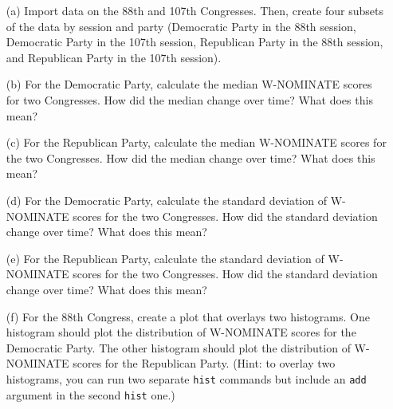\documentclass[12pt,letterpaper]{article}
\begin{document}
\begin{itemize}

\item[(a)] Import data on the 88th and 107th Congresses. Then, create four subsets of the data by session and party (Democratic Party in the 88th session, Democratic Party in the 107th session, Republican Party in the 88th session, and Republican Party in the 107th session). \\

\item[(b)] For the Democratic Party, calculate the median W-NOMINATE scores for two Congresses. How did the median change over time? What does this mean? \\

\item[(c)] For the Republican Party, calculate the median W-NOMINATE scores for the two Congresses. How did the median change over time? What does this mean? \\

\item[(d)] 
For the Democratic Party, calculate the standard deviation of W-NOMINATE scores for the two Congresses. How did the standard deviation change over time? What does this mean? \\

\item[(e)] For the Republican Party, calculate the standard deviation of W-NOMINATE scores for the two Congresses. How did the standard deviation change over time? What does this mean? \\



\item[(f)] For the 88th Congress, create a plot that overlays two histograms. One histogram should plot the distribution of W-NOMINATE scores for the Democratic Party. The other histogram should plot the distribution of W-NOMINATE scores for the Republican Party. (Hint: to overlay two histograms, you can run two separate \texttt{hist} commands but include an \texttt{add} argument in the second \texttt{hist} one.) \\


\end{itemize}
\end{document}
